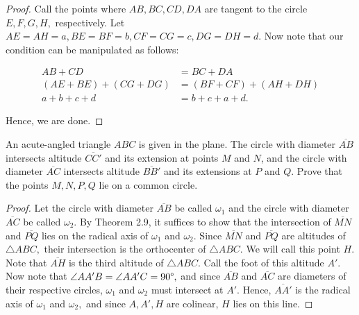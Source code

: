\documentclass[letterpaper,oneside]{scrartcl}
\begin{document}
\begin{proof}  Call the points where $AB, BC, CD, DA$ are tangent to the circle $E, F, G, H,$ respectively. Let $AE = AH = a, BE = BF = b, CF = CG = c, DG = DH = d.$ Now note that our condition can be manipulated as follows:

\begin{align*}
    AB + CD &= BC + DA \\
    (AE + BE) + (CG + DG) &= (BF + CF) + (AH + DH)\\
    a + b + c + d &= b + c + a + d.
\end{align*}

Hence, we are done.
\end{proof}

\begin{problem*}
  [2.26, USAMO 1990/5]
  An acute-angled triangle $ABC$ is given in the plane. The circle with diameter $\overline{AB}$ intersects altitude $\overline{CC'}$ and its extension at points $M$ and $N$, and the circle with diameter $\overline{AC}$ intersects altitude $\overline{BB'}$ and its extensions at $P$ and $Q$. Prove that the points $M, N, P , Q$ lie on a common circle.
\end{problem*}

\begin{proof}  Let the circle with diameter $\overline{AB}$ be called $\omega_1$ and the circle with diameter $\overline{AC}$ be called $\omega_2.$  By Theorem 2.9, it suffices to show that the intersection of $\overline{MN}$ and $\overline{PQ}$ lies on the radical axis of $\omega_1$ and $\omega_2.$ Since $\overline{MN}$ and $\overline{PQ}$ are altitudes of $\triangle ABC,$ their intersection is the orthocenter of $\triangle ABC.$ We will call this point $H.$ Note that $\overline{AH}$ is the third altitude of $\triangle ABC.$ Call the foot of this altitude $A'.$ Now note that $\angle AA'B = \angle AA'C = 90\degree,$ and since $\overline{AB}$ and $\overline{AC}$ are diameters of their respective circles, $\omega_1$ and $\omega_2$ must intersect at $A'.$ Hence, $\overline{AA'}$ is the radical axis of $\omega_1$ and $\omega_2,$ and since $A,A',H$ are colinear, $H$ lies on this line. \end{proof}
\end{document}
